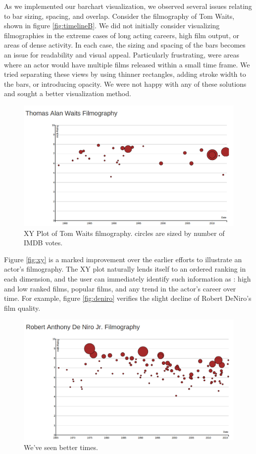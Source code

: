 \documentclass[12pt]{article}
\begin{document}
As we implemented our barchart visualization, we observed several issues relating to bar sizing, spacing, and overlap.  Consider the filmography of Tom Waits, shown in figure \ref{fig:timelineB}. We did not initially consider visualizing filmographies in the extreme cases of long acting careers, high film output, or areas of dense activity.  In each case, the sizing and spacing of the bars becomes an issue for readability and visual appeal.  Particularly frustrating, were areas where an actor would have multiple films released within a small time frame.  We tried separating these views by using thinner rectangles, adding stroke width to the bars, or introducing opacity.  We were not happy with any of these solutions and sought a better visualization method.

\begin{figure}
	\centering
	\includegraphics[width=.7\linewidth]{images/timelineC_crop_waits.png}
				  \caption{XY Plot of Tom Waits filmography.  circles are sized by number of  IMDB votes.}
\end{figure}\label{fig:xy}


Figure \ref{fig:xy} is a marked improvement over the earlier efforts to illustrate an actor's filmography.  The XY plot naturally lends itself to an ordered ranking  in each dimension, and the user can immediately identify such information as : high and low ranked films, popular films, and any trend in the actor's career over time.  For example, figure \ref{fig:deniro} verifies the slight decline of  Robert DeNiro's film quality.

\begin{figure}
	\centering
	\includegraphics[width=.7\linewidth]{images/Deniro_timeline.png}
				  \caption{We've seen better times.}
\end{figure}\label{fig:deniro}
\end{document}
